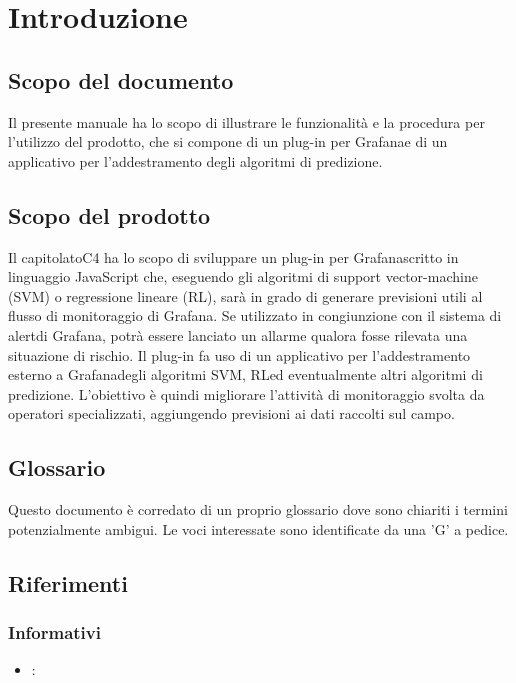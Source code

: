 \section{Introduzione}
	\subsection{Scopo del documento}
		Il presente manuale ha lo scopo di illustrare le funzionalità e la procedura per l'utilizzo del prodotto\glo, che si compone di un plug-in per Grafana\glosp e di un applicativo per l'addestramento degli algoritmi di predizione.
	\subsection{Scopo del prodotto}
		Il capitolato\glosp C4 ha lo scopo di sviluppare un plug-in per Grafana\glosp scritto in linguaggio JavaScript che, eseguendo gli algoritmi di support vector-machine (SVM\glo) o regressione lineare (RL\glo), sarà in grado di generare previsioni utili al flusso di monitoraggio di Grafana\glo. Se utilizzato in congiunzione con il sistema di alert\glosp di Grafana\glo, potrà essere lanciato un allarme qualora fosse rilevata una situazione di rischio.
		Il plug-in fa uso di un applicativo per l'addestramento esterno a Grafana\glosp degli algoritmi SVM\glo, RL\glosp ed eventualmente altri algoritmi di predizione. L'obiettivo è quindi migliorare l'attività di monitoraggio svolta da operatori specializzati, aggiungendo previsioni ai dati raccolti sul campo.
	\subsection{Glossario}
		Questo documento è corredato di un proprio glossario dove sono chiariti i termini potenzialmente ambigui. Le voci interessate sono identificate da una 'G' a pedice.
	\subsection{Riferimenti}
		\subsubsection{Informativi}
		\begin{itemize}
			\item \textbf{}:
		\end{itemize}
